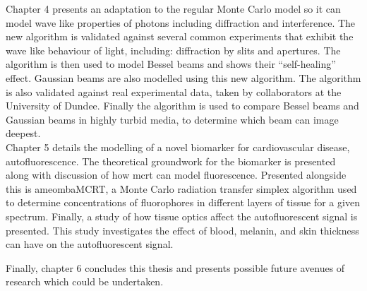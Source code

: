 Chapter 4 presents an adaptation to the regular Monte Carlo model so it can model wave like properties of photons including diffraction and interference.
The new algorithm is validated against several common experiments that exhibit the wave like behaviour of light, including: diffraction by slits and apertures.
The algorithm is then used to model Bessel beams and shows their ``self-healing'' effect.
Gaussian beams are also modelled using this new algorithm.
The algorithm is also validated against real experimental data, taken by collaborators at the University of Dundee.
Finally the algorithm is used to compare Bessel beams and Gaussian beams in highly turbid media, to determine which beam can image deepest.\\


Chapter 5 details the modelling of a novel biomarker for cardiovascular disease, autofluorescence.
The theoretical groundwork for the biomarker is presented along with discussion of how \gls*{mcrt} can model fluorescence.
Presented alongside this is ameombaMCRT, a Monte Carlo radiation transfer simplex algorithm used to determine concentrations of fluorophores in different layers of tissue for a given spectrum.
Finally, a study of how tissue optics affect the autofluorescent signal is presented. This study investigates the effect of blood, melanin, and skin thickness can have on the autofluorescent signal.


Finally, chapter 6 concludes this thesis and presents possible future avenues of research which could be undertaken.